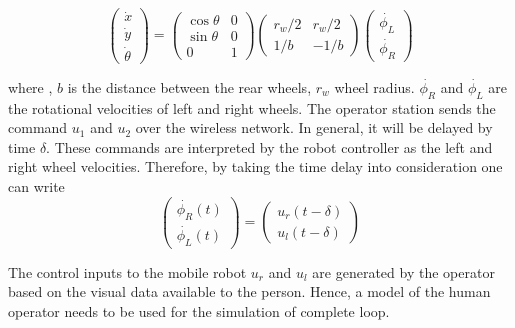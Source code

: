 \begin{equation}
\label{eqn:KinematicModelOfRobot}
\begin{pmatrix}
\dot{x}\\ 
\dot{y}\\ 
\dot{\theta}
\end{pmatrix}
=
\begin{pmatrix}
\cos \theta & 0 \\
\sin \theta & 0 \\
0& 1
\end{pmatrix}
\begin{pmatrix}
r_w/2 & r_w/2\\
1/b & -1/b
\end{pmatrix}
\begin{pmatrix}
\dot{\phi_L}\\
\dot{\phi_R}
\end{pmatrix}
\end{equation}


where ,  $b$ is the distance between the rear wheels, $r_w$ wheel radius. $\dot{\phi_R}$ and $\dot{\phi_L} $ are the rotational velocities of left and right wheels. 
The operator station sends the command $u_1$ and $u_2$ over the wireless network. In general, it will be delayed by time $\delta$. These commands are interpreted by the robot controller as the left and right wheel velocities.  Therefore, by taking the time delay into consideration one can write
\begin{equation}
\begin{pmatrix}
\dot{\phi_R}(t) \\
 \dot{\phi_L}(t)
\end{pmatrix}
=
\begin{pmatrix}
u_r(t-\delta)\\
u_l(t-\delta)
\end{pmatrix}
\end{equation}

The control inputs to the mobile robot  $u_r$ and $u_l$ are generated by the operator based on the visual data available to the person. Hence, a model of the human operator needs to be used for the simulation of complete loop.


